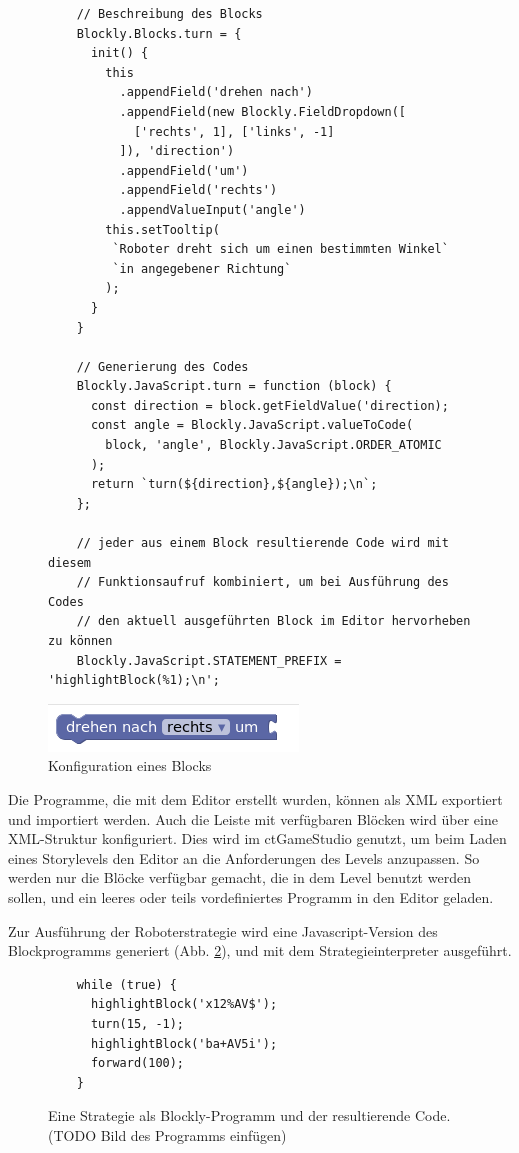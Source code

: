 \begin{figure}
  \caption{Konfiguration eines Blocks}

  \label{block-configuration}

  \begin{lstlisting}
    // Beschreibung des Blocks
    Blockly.Blocks.turn = {
      init() {
        this
          .appendField('drehen nach')
          .appendField(new Blockly.FieldDropdown([
            ['rechts', 1], ['links', -1]
          ]), 'direction')
          .appendField('um')
          .appendField('rechts')
          .appendValueInput('angle')
        this.setTooltip(
         `Roboter dreht sich um einen bestimmten Winkel`
         `in angegebener Richtung`
        );
      }
    }

    // Generierung des Codes
    Blockly.JavaScript.turn = function (block) {
      const direction = block.getFieldValue('direction);
      const angle = Blockly.JavaScript.valueToCode(
        block, 'angle', Blockly.JavaScript.ORDER_ATOMIC
      );
      return `turn(${direction},${angle});\n`;
    };

    // jeder aus einem Block resultierende Code wird mit diesem
    // Funktionsaufruf kombiniert, um bei Ausführung des Codes
    // den aktuell ausgeführten Block im Editor hervorheben zu können
    Blockly.JavaScript.STATEMENT_PREFIX = 'highlightBlock(%1);\n';
  \end{lstlisting}

  \includegraphics{figures/blockly_configuration_turn.png}
\end{figure}

Die Programme, die mit dem Editor erstellt wurden, können als XML exportiert und importiert werden.
Auch die Leiste mit verfügbaren Blöcken wird über eine XML-Struktur konfiguriert. Dies wird im
ctGameStudio genutzt, um beim Laden eines Storylevels den Editor an die Anforderungen des Levels
anzupassen. So werden nur die Blöcke verfügbar gemacht, die in dem Level benutzt werden sollen, und
ein leeres oder teils vordefiniertes Programm in den Editor geladen.

Zur Ausführung der Roboterstrategie wird eine Javascript-Version des Blockprogramms generiert (Abb.
\ref{code-generation}), und mit dem Strategieinterpreter ausgeführt.

\begin{figure}
  \caption{Eine Strategie als Blockly-Programm und der resultierende Code. (TODO Bild des Programms einfügen)}

  \label{code-generation}

  \begin{lstlisting}
    while (true) {
      highlightBlock('x12%AV$');
      turn(15, -1);
      highlightBlock('ba+AV5i');
      forward(100);
    }
  \end{lstlisting}
\end{figure}


